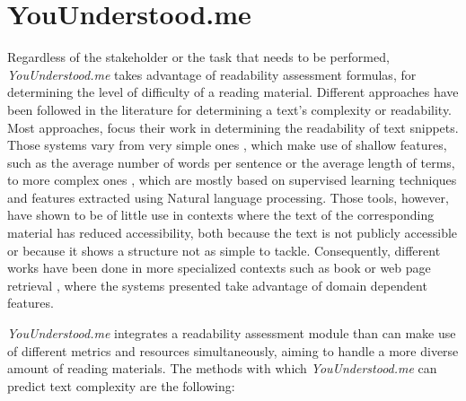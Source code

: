 \documentclass{sig-alternate-05-2015}
\begin{document}
 

\section{YouUnderstood.me}


\noindent
Regardless of the stakeholder or the task that needs to be performed, \textit{YouUnderstood.me}
takes advantage of readability assessment formulas, for determining the level of difficulty of a reading material. Different approaches have been followed in the literature for determining a text's complexity or readability. Most approaches, focus their work in determining the readability of text snippets. Those systems vary from very simple ones \cite{flesch1948new}, which make use of shallow features, such as the average number of words per sentence or the average length of terms, to more complex ones \cite{gonzalez2014simple,franccois2012ai,dell2011read} , which are mostly based on supervised learning techniques and features extracted using Natural language processing. Those tools, however,  have shown to be of little use in contexts where the text of the corresponding material has reduced accessibility, both because the text is not publicly accessible or because it shows a structure  not as simple to tackle. Consequently, different works have been done in more specialized contexts such as book \cite{denning2015readability,pera2014automating} or web page retrieval \cite{lau2006bilingual}, where the systems presented take advantage of domain dependent features.


\textit{YouUnderstood.me} integrates a readability assessment module than can make use of different metrics and resources simultaneously, aiming to handle a more diverse amount of reading materials. The methods with which  \textit{YouUnderstood.me} can predict text complexity are the following:
\end{document}
